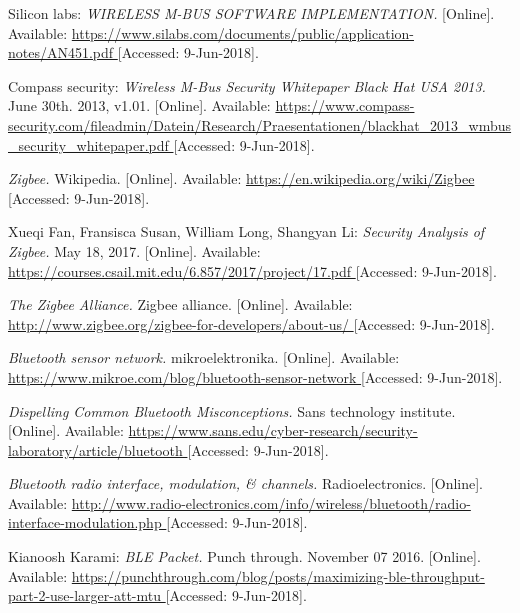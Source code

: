 \begin{thebibliography}{9}
Silicon labs: 
\textit{
WIRELESS M-BUS SOFTWARE IMPLEMENTATION.
}
[Online]. Available:
\url{
https://www.silabs.com/documents/public/application-notes/AN451.pdf
}
[Accessed: 9-Jun-2018].


Compass security:
\textit{
Wireless M-Bus Security Whitepaper Black Hat USA 2013.
}
June 30th. 2013, v1.01.
[Online]. Available:
\url{
https://www.compass-security.com/fileadmin/Datein/Research/Praesentationen/blackhat_2013_wmbus_security_whitepaper.pdf
}
[Accessed: 9-Jun-2018].


\textit{
Zigbee.
}
Wikipedia.
[Online]. Available:
\url{
https://en.wikipedia.org/wiki/Zigbee
}
[Accessed: 9-Jun-2018].



Xueqi Fan, Fransisca Susan, William Long, Shangyan Li: 
\textit{
Security Analysis of Zigbee.
}
May 18, 2017.
[Online]. Available:
\url{
https://courses.csail.mit.edu/6.857/2017/project/17.pdf
}
[Accessed: 9-Jun-2018].




\textit{
The Zigbee Alliance.
}
Zigbee alliance.
[Online]. Available:
\url{
http://www.zigbee.org/zigbee-for-developers/about-us/
}
[Accessed: 9-Jun-2018].



\textit{
Bluetooth sensor network.
}
mikroelektronika.
[Online]. Available:
\url{
https://www.mikroe.com/blog/bluetooth-sensor-network
}
[Accessed: 9-Jun-2018].

\textit{
Dispelling Common Bluetooth Misconceptions.
}
Sans technology institute.
[Online]. Available:
\url{
https://www.sans.edu/cyber-research/security-laboratory/article/bluetooth
}
[Accessed: 9-Jun-2018].

\textit{
Bluetooth radio interface, modulation, \& channels.
}
Radioelectronics.
[Online]. Available:
\url{
http://www.radio-electronics.com/info/wireless/bluetooth/radio-interface-modulation.php
}
[Accessed: 9-Jun-2018].

Kianoosh Karami: 
\textit{
BLE Packet.
} Punch through.  November 07 2016.  
[Online]. Available:
\url{
https://punchthrough.com/blog/posts/maximizing-ble-throughput-part-2-use-larger-att-mtu
}
[Accessed: 9-Jun-2018].


\end{thebibliography}
